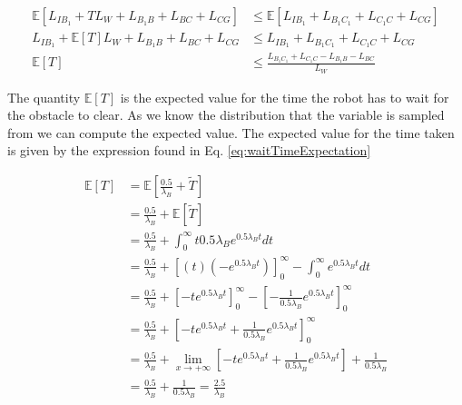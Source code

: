 \documentclass[a4paper,12pt]{article}
\begin{document}
			\begin{equation}
				\begin{split}
					\mathbb{E}\left[L_{IB_{1}} + TL_W + L_{B_{1}B} + L_{BC} + L_{CG}\right] & \leq \mathbb{E}\left[L_{IB_{1}} + L_{B_{1}C_{1}} + L_{C_{1}C} + L_{CG}\right] \\
					L_{IB_{1}} + \mathbb{E}\left[T\right] L_W + L_{B_{1}B} + L_{BC} + L_{CG} & \leq L_{IB_{1}} + L_{B_{1}C_{1}} + L_{C_{1}C} + L_{CG} \\
					\mathbb{E}\left[T\right] & \leq \frac{L_{B_{1}C_{1}} + L_{C_{1}C} - L_{B_{1}B} - L_{BC}}{L_W}
				\end{split}
				\label{eq:costExpectation1}
			\end{equation}

			The quantity $\mathbb{E}\left[T\right]$ is the expected value for the time the robot has to wait for the obstacle to clear. As we know the distribution that the variable is sampled from we can compute the expected value. The expected value for the time taken is given by the expression found in Eq. \ref{eq:waitTimeExpectation}

			\begin{equation}
				\begin{split}
					\mathbb{E}\left[T\right] & = \mathbb{E}\left[\frac{0.5}{\lambda_{B}}+\widetilde{T}\right] \\
					& = \frac{0.5}{\lambda_{B}} + \mathbb{E}\left[\widetilde{T}\right] \\
					& = \frac{0.5}{\lambda_{B}} + \int_{0}^{\infty}t0.5\lambda_{B}e^{0.5\lambda_{B}t} dt \\
					& = \frac{0.5}{\lambda_{B}} + \left[\left(t\right) \left(-e^{0.5\lambda_{B}t}\right)\right]_{0}^{\infty} - \int_{0}^{\infty}e^{0.5\lambda_{B}t} dt \\
					& = \frac{0.5}{\lambda_{B}} + \left[-te^{0.5\lambda_{B}t}\right]_{0}^{\infty} - \left[-\frac{1}{0.5\lambda_{B}}e^{0.5\lambda_{B}t}\right]_{0}^{\infty} \\
					& = \frac{0.5}{\lambda_{B}} + \left[-te^{0.5\lambda_{B}t} + \frac{1}{0.5\lambda_{B}}e^{0.5\lambda_{B}t}\right]_{0}^{\infty} \\
					& = \frac{0.5}{\lambda_{B}} + \lim_{x \to +\infty} \left[-te^{0.5\lambda_{B}t} + \frac{1}{0.5\lambda_{B}}e^{0.5\lambda_{B}t}\right] + \frac{1}{0.5\lambda_{B}} \\
					& = \frac{0.5}{\lambda_{B}} + \frac{1}{0.5\lambda_{B}} = \frac{2.5}{\lambda_{B}}
				\end{split}
				\label{eq:waitTimeExpectation}
			\end{equation}
\end{document}
